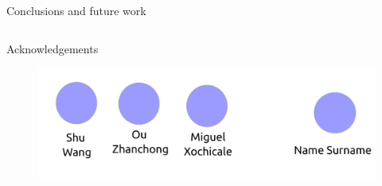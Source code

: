 {\begin{frame}{Conclusions and future work}
\begin{columns}
\begin{column}{.3\linewidth}
    \end{column}
  \end{columns}

\end{frame}
}


{
\begin{frame}{Acknowledgements}

  \begin{figure}
  \centering
  \includegraphics[width=1.0\textwidth]{./figures/team/versions/drawing-v00.png}
  \end{figure}

\end{frame}
}

